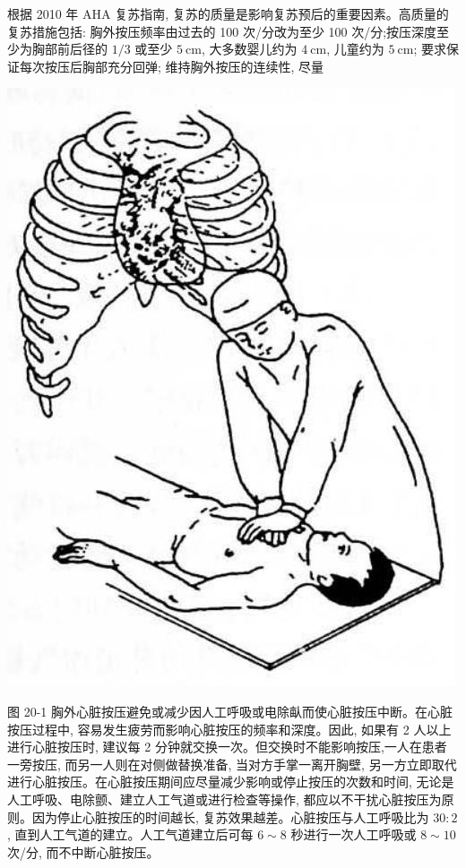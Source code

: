 \documentclass[10pt]{article}
\begin{document}
根据 2010 年 AHA 复苏指南, 复苏的质量是影响复苏预后的重要因素。高质量的复苏措施包括: 胸外按压频率由过去的 100 次/分改为至少 100 次/分;按压深度至少为胸部前后径的 $1 / 3$ 或至少 $5 \mathrm{~cm}$, 大多数婴儿约为 $4 \mathrm{~cm}$, 儿童约为 $5 \mathrm{~cm}$; 要求保证每次按压后胸部充分回弹; 维持胸外按压的连续性, 尽量

\begin{center}
\includegraphics[max width=\textwidth]{2024_07_09_002a177993bd97d1d6d7g-208(1)}
\end{center}

图 20-1 胸外心脏按压避免或减少因人工呼吸或电除畒而使心脏按压中断。在心脏按压过程中, 容易发生疲劳而影响心脏按压的频率和深度。因此, 如果有 2 人以上进行心脏按压时, 建议每 2 分钟就交换一次。但交换时不能影响按压,一人在患者一旁按压, 而另一人则在对侧做替换准备, 当对方手掌一离开胸壁, 另一方立即取代进行心脏按压。在心脏按压期间应尽量减少影响或停止按压的次数和时间, 无论是人工呼吸、电除颤、建立人工气道或进行检查等操作, 都应以不干扰心脏按压为原则。因为停止心脏按压的时间越长, 复苏效果越差。心脏按压与人工呼吸比为 $30: 2$, 直到人工气道的建立。人工气道建立后可每 $6 \sim 8$ 秒进行一次人工呼吸或 $8 \sim 10$ 次/分, 而不中断心脏按压。
\end{document}
